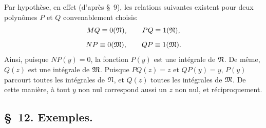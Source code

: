 Par hypothèse, en effet (d'après \S~9), les relations suivantes existent pour deux polynômes $P$ et $Q$ convenablement choisis:
\[
 MQ\equiv0(\mathfrak{N}),\qquad PQ\equiv1(\mathfrak{N}),
\]
\[
 NP\equiv0(\mathfrak{M}),\qquad QP\equiv1(\mathfrak{M}).
\]
Ainsi, puisque $NP(y)=0$, la fonction $P(y)$ est une intégrale de $\mathfrak{N}$. De même, $Q(z)$ est une intégrale de $\mathfrak{M}$. Puisque $PQ(z)=z$ et $QP(y)=y$, $P(y)$ parcourt toutes les intégrales de $\mathfrak{N}$, et $Q(z)$ toutes les intégrales de $\mathfrak{M}$. De cette manière, à tout $y$ non nul correspond aussi un $z$ non nul, et réciproquement.

\subsection*{\S~12. Exemples.}

